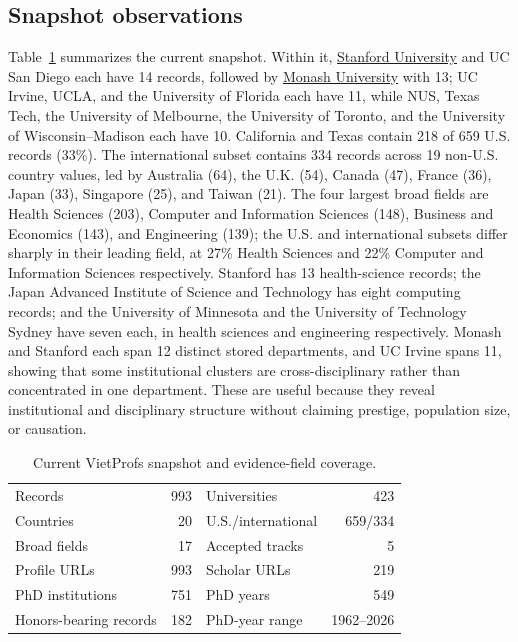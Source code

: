 \documentclass[11pt]{article}
\newcommand{\vplink}[2]{\href{https://vietprofs.roars.dev/?q=#1}{#2}}
\begin{document}
\subsection{Snapshot observations}
Table~\ref{tab:snapshot} summarizes the current snapshot.
Within it, \vplink{Stanford}{Stanford University} and UC San Diego each have 14 records, followed by
\vplink{Monash}{Monash University} with 13; UC Irvine, UCLA, and the University of Florida each have
11, while NUS, Texas Tech, the University of Melbourne, the University of Toronto, and the
University of Wisconsin--Madison each have 10.
California and Texas contain 218 of 659 U.S. records (33\%).
The international subset contains 334 records across 19 non-U.S. country values, led by Australia (64), the U.K. (54), Canada (47), France (36), Japan (33), Singapore (25), and Taiwan (21).
The four largest broad fields are Health Sciences (203), Computer and Information Sciences (148), Business and Economics (143), and Engineering (139); the U.S. and international subsets differ sharply in their leading field, at 27\% Health Sciences and 22\% Computer and Information Sciences respectively.
Stanford has 13 health-science records; the Japan Advanced Institute of Science and Technology has eight computing records; and the University of Minnesota and the University of Technology Sydney have seven each, in health sciences and engineering respectively.
Monash and Stanford each span 12 distinct stored departments, and UC Irvine spans 11, showing that some institutional clusters are cross-disciplinary rather than concentrated in one department.
These are useful because they reveal institutional and disciplinary structure without claiming prestige, population size, or causation.

\begin{table}[t]
\centering
\caption{Current VietProfs snapshot and evidence-field coverage.}
\label{tab:snapshot}
\small
\begin{tabular}{lr@{\qquad}lr}
\toprule
Records & 993 & Universities & 423\\
Countries & 20 & U.S./international & 659/334\\
Broad fields & 17 & Accepted tracks & 5\\
Profile URLs & 993 & Scholar URLs & 219\\
PhD institutions & 751 & PhD years & 549\\
Honors-bearing records & 182 & PhD-year range & 1962--2026\\
\bottomrule
\end{tabular}
\end{table}
\end{document}

